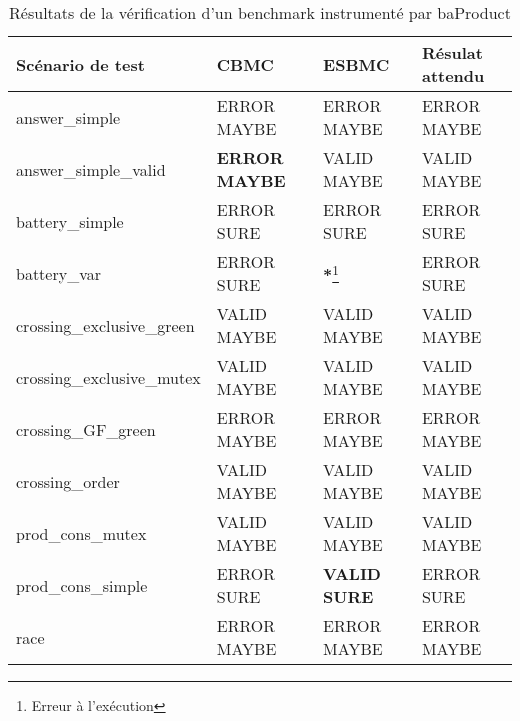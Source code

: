 \begin{table}[]
\centering
\caption{Résultats de la vérification d'un benchmark instrumenté par baProduct}
\label{tbl:resultats}
\begin{tabular}{|l|l|l|l|}
\hline
Scénario de test           & CBMC                 & ESBMC            & Résulat attendu \\
\hline
answer\_simple             & ERROR MAYBE          & ERROR MAYBE      & ERROR MAYBE     \\
answer\_simple\_valid      & \textbf{ERROR MAYBE} & VALID MAYBE      & VALID MAYBE     \\
battery\_simple            & ERROR SURE           & ERROR SURE       & ERROR SURE      \\
battery\_var               & ERROR SURE           & \textbf{*}\footnote{Erreur à l'exécution}& ERROR SURE      \\
crossing\_exclusive\_green & VALID MAYBE          & VALID MAYBE      & VALID MAYBE     \\
crossing\_exclusive\_mutex & VALID MAYBE          & VALID MAYBE      & VALID MAYBE     \\
crossing\_GF\_green        & ERROR MAYBE          & ERROR MAYBE      & ERROR MAYBE     \\
crossing\_order            & VALID MAYBE          & VALID MAYBE      & VALID MAYBE     \\
prod\_cons\_mutex          & VALID MAYBE          & VALID MAYBE      & VALID MAYBE     \\
prod\_cons\_simple         & ERROR SURE           & \textbf{VALID SURE} & ERROR SURE      \\
race                       & ERROR MAYBE          & ERROR MAYBE      & ERROR MAYBE     \\
\hline
\end{tabular}
\end{table}

